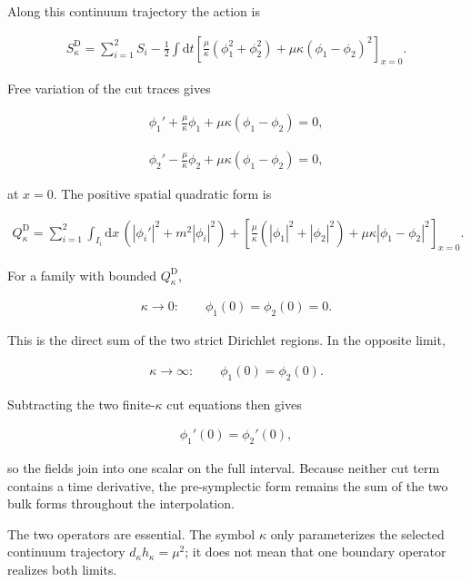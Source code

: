 Along this continuum trajectory the action is

\begin{align}
S_\kappa^{\mathrm D}
=\sum_{i=1}^2 S_i
-\frac12\int\mathrm dt\left[
\frac\mu\kappa(\phi_1^2+\phi_2^2)
+\mu\kappa(\phi_1-\phi_2)^2
\right]_{x=0}.
\end{align}

Free variation of the cut traces gives

\begin{align}
\phi_1'
+\frac\mu\kappa\phi_1
+\mu\kappa(\phi_1-\phi_2)=0,
\end{align}

\begin{align}
\phi_2'
-\frac\mu\kappa\phi_2
+\mu\kappa(\phi_1-\phi_2)=0,
\end{align}

at $x=0$. The positive spatial quadratic form is

\begin{align}
Q_\kappa^{\mathrm D}
=\sum_{i=1}^2\int_{I_i}\mathrm dx\,
(|\phi_i'|^2+m^2|\phi_i|^2)
+\left[
\frac\mu\kappa(|\phi_1|^2+|\phi_2|^2)
+\mu\kappa|\phi_1-\phi_2|^2
\right]_{x=0}.
\end{align}

For a family with bounded $Q_\kappa^{\mathrm D}$,

\begin{align}
\kappa\to0:
\qquad
\phi_1(0)=\phi_2(0)=0.
\end{align}

This is the direct sum of the two strict Dirichlet regions. In the opposite limit,

\begin{align}
\kappa\to\infty:
\qquad
\phi_1(0)=\phi_2(0).
\end{align}

Subtracting the two finite-$\kappa$ cut equations then gives

\begin{align}
\phi_1'(0)=\phi_2'(0),
\end{align}

so the fields join into one scalar on the full interval. Because neither cut term contains a time derivative, the pre-symplectic form remains the sum of the two bulk forms throughout the interpolation.

The two operators are essential. The symbol $\kappa$ only parameterizes the selected continuum trajectory $d_\kappa h_\kappa=\mu^2$; it does not mean that one boundary operator realizes both limits.

